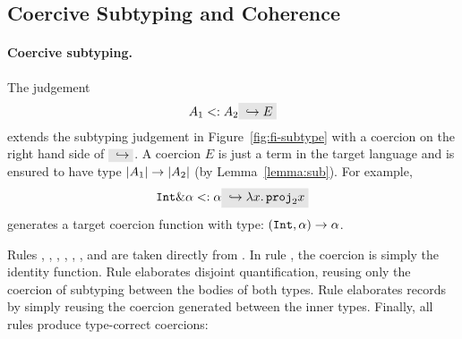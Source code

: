 \subsection{Coercive Subtyping and Coherence}

\paragraph{Coercive subtyping.}

The judgement
\[
A_1 \subtype A_2 \yields E
\]
extends the subtyping judgement in Figure~\ref{fig:fi-subtype} with a coercion
on the right hand side of $ \yields {} $. A coercion $ E $ is just a term
in the target language and is ensured to have type
$ \lvert A_1 \rvert \to \lvert A_2 \rvert $ (by Lemma~\ref{lemma:sub}). For example,
\[
\tyint \inter \alpha \subtype \alpha \yields {\lamty x {\im {\tyint \inter \tybool}} {\proj 2 x}}
\]
generates a target coercion function with type: $(\texttt{Int},\alpha) \to \alpha$.

Rules , , ,
, , , and
 are taken directly from \oldname.
In rule , the coercion is simply the identity function.
Rule  elaborates disjoint quantification, reusing only the coercion of 
subtyping between the bodies of both types. 
Rule  elaborates records by simply reusing the coercion generated between
the inner types.
Finally, all rules produce type-correct coercions:


